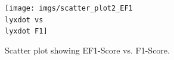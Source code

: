 \begin{figure}[H]
\begin{centering}
\par\end{centering}
\begin{centering}
{\texttt{[image: imgs/scatter\_plot2\_EF1\\lyxdot vs\\lyxdot F1]}}
\par\end{centering}
\caption{Scatter plot showing EF1-Score vs. F1-Score.}
\label{fig:F1_vs_EF1_Enron}
\end{figure}









